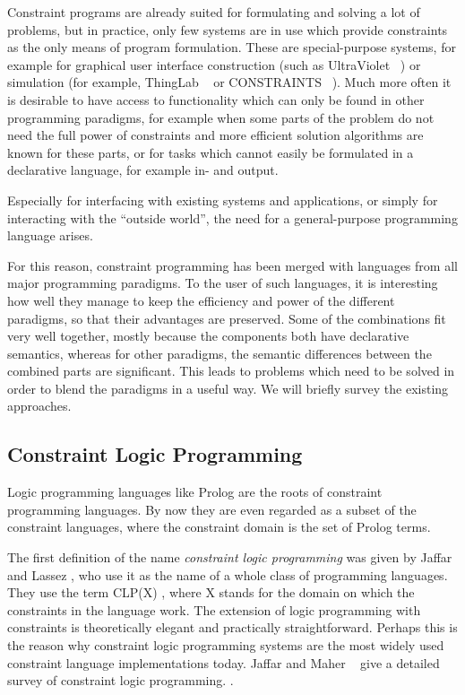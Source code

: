 Constraint programs are already suited for formulating and solving a
lot of problems, but in practice, only few systems are in use which
provide constraints as the only means of program formulation.  These
are special-purpose systems, for example for graphical user interface
construction (such as
UltraViolet%
~\cite{borning95oti,borning98ultraviolet}) or
simulation (for example, ThingLab%
~\cite{borning79thinglab} or
CONSTRAINTS%
~\cite{sussman80constraints}).  Much more often it
is desirable to have access to functionality which can only be found
in other programming paradigms, for example when some parts of the
problem do not need the full power of constraints and more efficient
solution algorithms are known for these parts, or for tasks which
cannot easily be formulated in a declarative language, for example in-
and output.

Especially for interfacing with existing systems and applications, or
simply for interacting with the ``outside world'', the need for a
general-purpose programming language arises.

For this reason, constraint programming has been merged with languages
from all major programming paradigms.  To the user of such languages,
it is interesting how well they manage to keep the efficiency and
power of the different paradigms, so that their advantages are
preserved.  Some of the combinations fit very well together, mostly
because the components both have declarative semantics, whereas for
other paradigms, the semantic differences between the combined parts
are significant.  This leads to problems which need to be solved in
order to blend the paradigms in a useful way.  We will briefly survey
the existing approaches.


\subsection{Constraint Logic Programming}
\label{sec:constraint-logic-programming}

Logic programming%
 languages like Prolog%
 are the roots of constraint programming languages.  By
now they are even regarded as a subset of the constraint languages,
where the constraint domain is the set of Prolog terms.

The first definition of the name {\em constraint logic programming}%
was given by Jaffar%
 and Lassez%
 \cite{jaffar87clp}, who use it as the name of a whole
class of programming languages.  They use the term
CLP(X)%
%
, where X stands for the domain on which the constraints in
the language work.  The extension of logic programming with
constraints is theoretically elegant and practically straightforward.
Perhaps this is the reason why constraint logic programming systems
are the most widely used constraint language implementations today.
Jaffar%
 and Maher%
~\cite{jaffar94clpsurvey} give a detailed survey of
constraint logic programming.  .

